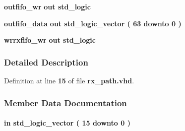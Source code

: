 \begin{DoxyCompactItemize}
\item 
{\bf outfifo\+\_\+wr}  {\bfseries {\bfseries \textcolor{keywordflow}{out}\textcolor{vhdlchar}{ }}} {\bfseries \textcolor{comment}{std\+\_\+logic}\textcolor{vhdlchar}{ }} 
\item 
{\bf outfifo\+\_\+data}  {\bfseries {\bfseries \textcolor{keywordflow}{out}\textcolor{vhdlchar}{ }}} {\bfseries \textcolor{comment}{std\+\_\+logic\+\_\+vector}\textcolor{vhdlchar}{ }\textcolor{vhdlchar}{(}\textcolor{vhdlchar}{ }\textcolor{vhdlchar}{ } \textcolor{vhdldigit}{63} \textcolor{vhdlchar}{ }\textcolor{keywordflow}{downto}\textcolor{vhdlchar}{ }\textcolor{vhdlchar}{ } \textcolor{vhdldigit}{0} \textcolor{vhdlchar}{ }\textcolor{vhdlchar}{)}\textcolor{vhdlchar}{ }} 
\item 
{\bf wrrxfifo\+\_\+wr}  {\bfseries {\bfseries \textcolor{keywordflow}{out}\textcolor{vhdlchar}{ }}} {\bfseries \textcolor{comment}{std\+\_\+logic}\textcolor{vhdlchar}{ }} 
\end{DoxyCompactItemize}


\subsubsection{Detailed Description}


Definition at line {\bf 15} of file {\bf rx\+\_\+path.\+vhd}.



\subsubsection{Member Data Documentation}
\paragraph[{ch\+\_\+en}]{ {\bfseries \textcolor{keywordflow}{in}\textcolor{vhdlchar}{ }} {\bfseries \textcolor{comment}{std\+\_\+logic\+\_\+vector}\textcolor{vhdlchar}{ }\textcolor{vhdlchar}{(}\textcolor{vhdlchar}{ }\textcolor{vhdlchar}{ } \textcolor{vhdldigit}{15} \textcolor{vhdlchar}{ }\textcolor{keywordflow}{downto}\textcolor{vhdlchar}{ }\textcolor{vhdlchar}{ } \textcolor{vhdldigit}{0} \textcolor{vhdlchar}{ }\textcolor{vhdlchar}{)}\textcolor{vhdlchar}{ }} \hspace{0.3cm}{\ttfamily [Port]}}\label{classrx__path_a91cbe36eb60cd94d2e192dc892bd7f52}


